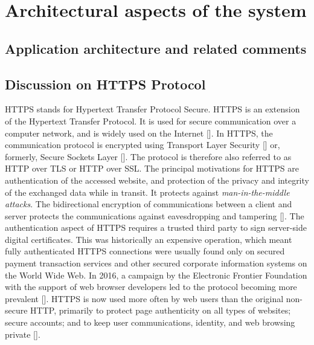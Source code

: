 \chapter{Architectural aspects of the system}\label{ch:architectural-aspects-of-the-system}


\section{Application architecture and related comments}\label{sec:application-architecture-and-related-comments}




\section{Discussion on HTTPS Protocol}\label{sec:discussion-on-https-protocol}
HTTPS stands for Hypertext Transfer Protocol Secure.
HTTPS is an extension of the Hypertext Transfer Protocol.
It is used for secure communication over a computer network,
and is widely used on the Internet [\cite{lam2000secure, karayiannis2019implementing}].
In HTTPS, the communication protocol is encrypted using Transport Layer Security [\cite{turner2014transport}]
or, formerly, Secure Sockets Layer [\cite{weaver2006secure}].
The protocol is therefore also referred to as HTTP over TLS or HTTP over SSL\@.
The principal motivations for HTTPS are authentication of the accessed website, and protection of the privacy and integrity
of the exchanged data while in transit.
It protects against \textit{man-in-the-middle attacks}.
The bidirectional encryption of communications between a client and server protects the communications against
eavesdropping and tampering [\cite{mayer2016tlscompare, jiang2019physical}].
The authentication aspect of HTTPS requires a trusted third party to sign server-side digital certificates.
This was historically an expensive operation, which meant fully authenticated HTTPS connections were usually found only
on secured payment transaction services and other secured corporate information systems on the World Wide Web.
In 2016, a campaign by the Electronic Frontier Foundation with the support of web browser developers led to the protocol
becoming more prevalent [\cite{he2014shadowcrypt}].
HTTPS is now used more often by web users than the original non-secure HTTP, primarily to protect
page authenticity on all types of websites;
secure accounts;
and to keep user communications, identity, and web browsing private [\cite{rescorla2000rfc2818}].

